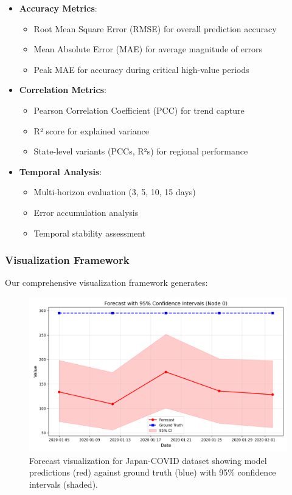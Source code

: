 \documentclass[lettersize, journal]{IEEEtran}
\begin{document}
\begin{itemize}
    \item \textbf{Accuracy Metrics}:
    \begin{itemize}
        \item Root Mean Square Error (RMSE) for overall prediction accuracy
        \item Mean Absolute Error (MAE) for average magnitude of errors
        \item Peak MAE for accuracy during critical high-value periods
    \end{itemize}
    
    \item \textbf{Correlation Metrics}:
    \begin{itemize}
        \item Pearson Correlation Coefficient (PCC) for trend capture
        \item R² score for explained variance
        \item State-level variants (PCCs, R²s) for regional performance
    \end{itemize}
    
    \item \textbf{Temporal Analysis}:
    \begin{itemize}
        \item Multi-horizon evaluation (3, 5, 10, 15 days)
        \item Error accumulation analysis
        \item Temporal stability assessment
    \end{itemize}
\end{itemize}

\subsubsection{Visualization Framework}
Our comprehensive visualization framework generates:

\begin{figure}[htbp]
    \centering
    \includegraphics[width=\columnwidth]{../figures/forecast_japan.w-20.h-5.png}
    \caption{Forecast visualization for Japan-COVID dataset showing model predictions (red) against ground truth (blue) with 95\% confidence intervals (shaded).}
    \label{fig:forecast_japan}
\end{figure}
\end{document}
